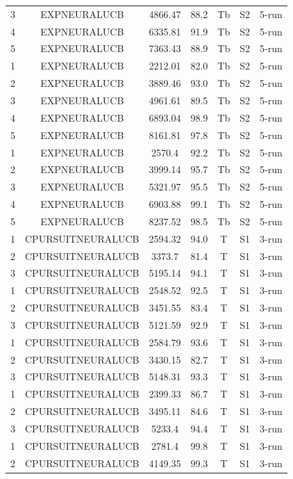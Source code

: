 \documentclass[11pt]{article}
\begin{document}
\begin{center}
\begin{longtable}{|c|c|c|c|c|c|c|}
3 & EXPNEURALUCB & 4866.47 & 88.2 & Tb & S2 & 5-run \\
4 & EXPNEURALUCB & 6335.81 & 91.9 & Tb & S2 & 5-run \\
5 & EXPNEURALUCB & 7363.43 & 88.9 & Tb & S2 & 5-run \\
1 & EXPNEURALUCB & 2212.01 & 82.0 & Tb & S2 & 5-run \\
2 & EXPNEURALUCB & 3889.46 & 93.0 & Tb & S2 & 5-run \\
3 & EXPNEURALUCB & 4961.61 & 89.5 & Tb & S2 & 5-run \\
4 & EXPNEURALUCB & 6893.04 & 98.9 & Tb & S2 & 5-run \\
5 & EXPNEURALUCB & 8161.81 & 97.8 & Tb & S2 & 5-run \\
1 & EXPNEURALUCB & 2570.4 & 92.2 & Tb & S2 & 5-run \\
2 & EXPNEURALUCB & 3999.14 & 95.7 & Tb & S2 & 5-run \\
3 & EXPNEURALUCB & 5321.97 & 95.5 & Tb & S2 & 5-run \\
4 & EXPNEURALUCB & 6903.88 & 99.1 & Tb & S2 & 5-run \\
5 & EXPNEURALUCB & 8237.52 & 98.5 & Tb & S2 & 5-run \\
1 & CPURSUITNEURALUCB & 2594.32 & 94.0 & T & S1 & 3-run \\
2 & CPURSUITNEURALUCB & 3373.7 & 81.4 & T & S1 & 3-run \\
3 & CPURSUITNEURALUCB & 5195.14 & 94.1 & T & S1 & 3-run \\
1 & CPURSUITNEURALUCB & 2548.52 & 92.5 & T & S1 & 3-run \\
2 & CPURSUITNEURALUCB & 3451.55 & 83.4 & T & S1 & 3-run \\
3 & CPURSUITNEURALUCB & 5121.59 & 92.9 & T & S1 & 3-run \\
1 & CPURSUITNEURALUCB & 2584.79 & 93.6 & T & S1 & 3-run \\
2 & CPURSUITNEURALUCB & 3430.15 & 82.7 & T & S1 & 3-run \\
3 & CPURSUITNEURALUCB & 5148.31 & 93.3 & T & S1 & 3-run \\
1 & CPURSUITNEURALUCB & 2399.33 & 86.7 & T & S1 & 3-run \\
2 & CPURSUITNEURALUCB & 3495.11 & 84.6 & T & S1 & 3-run \\
3 & CPURSUITNEURALUCB & 5233.4 & 94.4 & T & S1 & 3-run \\
1 & CPURSUITNEURALUCB & 2781.4 & 99.8 & T & S1 & 3-run \\
2 & CPURSUITNEURALUCB & 4149.35 & 99.3 & T & S1 & 3-run \\

\end{longtable}
\end{center}
\end{document}
